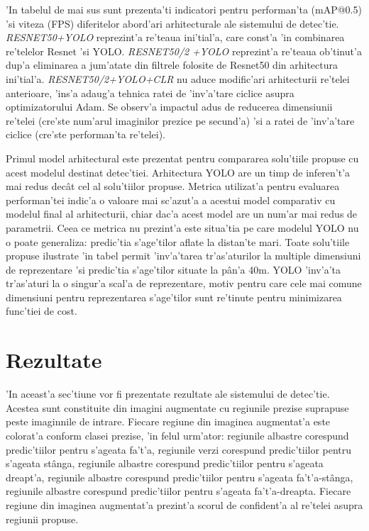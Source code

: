 \documentclass[12pt,a4paper,twoside]{report}
\begin{document}
'In tabelul de mai sus sunt prezenta'ti indicatori pentru performan'ta (mAP@0.5) 'si viteza (FPS) diferitelor abord'ari arhitecturale ale sistemului de detec'tie. \textit{RESNET50+YOLO} reprezint'a re'teaua ini'tial'a, care const'a 'in combinarea re'telelor Resnet 'si YOLO. \textit{RESNET50/2} \textit{+YOLO} reprezint'a re'teaua ob'tinut'a dup'a eliminarea a jum'atate din filtrele folosite de Resnet50 din arhitectura ini'tial'a. \textit{RESNET50/2+YOLO+CLR} nu aduce modific'ari arhitecturii re'telei anterioare, 'ins'a adaug'a tehnica ratei de 'inv'a'tare ciclice asupra optimizatorului Adam. Se observ'a impactul adus de reducerea dimensiunii re'telei (cre'ste num'arul imaginilor prezice pe secund'a) 'si a ratei de 'inv'a'tare ciclice (cre'ste performan'ta re'telei). 

Primul model arhitectural este prezentat pentru compararea solu'tiile propuse cu acest modelul destinat detec'tiei. Arhitectura YOLO are un timp de inferen't'a mai redus dec\^at cel al solu'tiilor propuse. Metrica utilizat'a pentru evaluarea performan'tei indic'a o valoare mai sc'azut'a a acestui model comparativ cu modelul final al arhitecturii, chiar dac'a acest model are un num'ar mai redus de parametrii. Ceea ce metrica nu prezint'a este situa'tia pe care modelul YOLO nu o poate generaliza: predic'tia s'age'tilor aflate la distan'te mari. Toate solu'tiile propuse ilustrate 'in tabel permit 'inv'a'tarea tr'as'aturilor la multiple dimensiuni de reprezentare 'si predic'tia s'age'tilor situate la p\^an'a 40m. YOLO 'inv'a'ta tr'as'aturi la o singur'a scal'a de reprezentare, motiv pentru care cele mai comune dimensiuni pentru reprezentarea s'age'tilor sunt re'tinute pentru minimizarea func'tiei de cost.

\section{Rezultate}
'In aceast'a sec'tiune vor fi prezentate rezultate ale sistemului de detec'tie. Acestea sunt constituite din imagini augmentate cu regiunile prezise suprapuse peste imaginnile de intrare. Fiecare regiune din imaginea augmentat'a este colorat'a conform clasei prezise, 'in felul urm'ator: regiunile albastre corespund predic'tiilor pentru s'ageata fa't'a, regiunile verzi corespund predic'tiilor pentru s'ageata st\^anga, regiunile albastre corespund predic'tiilor pentru s'ageata dreapt'a, regiunile albastre corespund predic'tiilor pentru s'ageata fa't'a-st\^anga, regiunile albastre corespund predic'tiilor pentru s'ageata fa't'a-dreapta. Fiecare regiune din imaginea augmentat'a prezint'a scorul de confident'a al re'telei asupra regiunii propuse.
\end{document}
